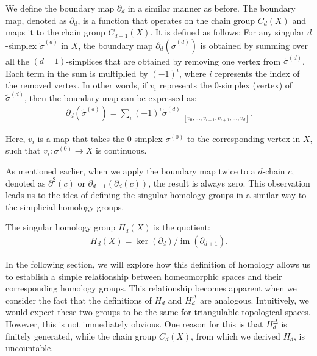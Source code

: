 We define the boundary map \( \partial_{d} \) in a similar manner as before. The boundary map, denoted as \( \partial_{d} \), is a function that operates on the chain group \( C_{d}(X) \) and maps it to the chain group \( C_{d-1}(X) \). It is defined as follows: For any singular \( d \)-simplex \( \tilde{\sigma}^{(d)} \) in \( X \), the boundary map \( \partial_{d}(\tilde{\sigma}^{(d)}) \) is obtained by summing over all the \( (d-1) \)-simplices that are obtained by removing one vertex from \( \tilde{\sigma}^{(d)} \). Each term in the sum is multiplied by \( (-1)^{i} \), where \( i \) represents the index of the removed vertex. In other words, if \( v_{i} \) represents the \( 0 \)-simplex (vertex) of \( \tilde{\sigma}^{(d)} \), then the boundary map can be expressed as:
\begin{align}
	\partial_{d}(\tilde{\sigma}^{(d)}) = \sum_{i} (-1)^{i} \tilde{\sigma}^{(d)}\vert_{[v_0, \ldots, v_{i-1}, v_{i+1}, \ldots, v_d]}. 
\end{align}

Here, \( v_{i} \) is a map that takes the \( 0 \)-simplex \( \sigma^{(0)} \) to the corresponding vertex in \( X \), such that \( v_{i}: \sigma^{(0)} \to X \) is continuous.

As mentioned earlier, when we apply the boundary map twice to a \( d \)-chain \( c \), denoted as \( \partial^{2}(c) \) or \( \partial_{d-1}(\partial_{d}(c)) \), the result is always zero. This observation leads us to the idea of defining the singular homology groups in a similar way to the simplicial homology groups.

\begin{definition}
	The singular homology group \( H_{d}(X) \) is the quotient:
	\begin{align}
		H_{d}(X) = \ker(\partial_{d}) / \operatorname{im}(\partial_{d+1}). 
	\end{align}
\end{definition}

In the following section, we will explore how this definition of homology allows us to establish a simple relationship between homeomorphic spaces and their corresponding homology groups. This relationship becomes apparent when we consider the fact that the definitions of \( H_{d} \) and \( H^{\Delta}_{d} \) are analogous. Intuitively, we would expect these two groups to be the same for triangulable topological spaces. However, this is not immediately obvious. One reason for this is that \( H^{\Delta}_{d} \) is finitely generated, while the chain group \( C_{d}(X) \), from which we derived \( H_{d} \), is uncountable.

